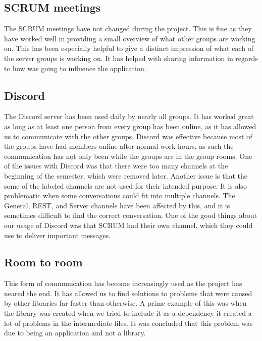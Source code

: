 \subsection{SCRUM meetings}
The SCRUM meetings have not changed during the project. This is fine as they
have worked well in providing a small overview of what other groups are working
on. This has been especially helpful to give a distinct impression of what each
of the server groups is working on. It has helped with sharing information in
regards to how  was going to influence the application.

\subsection{Discord}
The Discord server has been used daily by nearly all groups. It has worked
great as long as at least one person from every group has been online, as it
has allowed us to communicate with the other groups. Discord was effective
because most of the groups have had members online after normal work hours, as
such the communication has not only been while the groups are in the group rooms.
One of the issues with Discord was that there were too many channels at the
beginning of the semester, which were removed later. Another issue is that the
some of the labeled channels are not used for their intended purpose. It is
also problematic when some conversations could fit into multiple channels. The
General, REST, and Server channels have been affected by this, and it is
sometimes difficult to find the correct conversation. One of the good things
about our usage of Discord was that SCRUM had their own channel, which they
could use to deliver important messages.

\subsection{Room to room}
This form of communication has become increasingly used as the project has
neared the end. It has allowed us to find solutions to problems that were caused by
other libraries far faster than otherwise. A prime example of this was when the
 library was created when we tried to include it as
a dependency it created a lot of problems in the intermediate files. It was
concluded that this problem was due to  being an
application and not a library.
